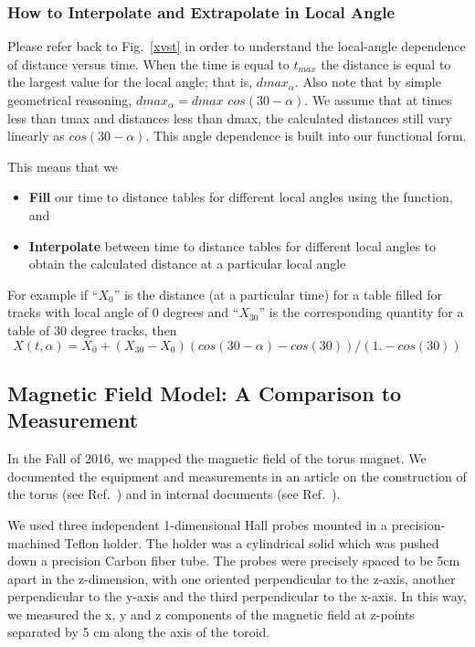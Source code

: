 \subsubsection{How to Interpolate and Extrapolate in Local Angle}
Please refer back to Fig.~\ref{xvst} in order to understand the local-angle dependence
of distance versus time.  When the time is equal to $t_{max}$ the distance is equal to
the largest value for the local angle; that is, $dmax_{\alpha}$.  Also note that by
simple geometrical reasoning, $dmax_{\alpha} = dmax$  $cos(30-\alpha)$.
We assume that at times less than tmax and distances less than dmax, the calculated
distances still vary linearly as $cos(30-\alpha)$.  This angle dependence is built into
our functional form.

This means that we
\begin{itemize}
\item {\bf Fill} our time to distance tables for different local angles using the function, and
\item {\bf Interpolate} between time to distance tables for different local angles to obtain
the calculated distance at a particular local angle
\end{itemize}
For example if ``$X_0$'' is the distance (at a particular time) for a table filled for tracks with local angle of 0 degrees
and ``$X_{30}$'' is the corresponding quantity for a table of 30 degree tracks, then
\begin{equation} 
\label{eq-extrap30}
X(t,\alpha) = X_0 + (X_{30}-X_0) (cos(30-\alpha) - cos(30)) / (1. - cos(30))
\end{equation}

\subsection{Magnetic Field Model: A Comparison to Measurement}
In the Fall of 2016, we mapped the magnetic field of the torus magnet.
We documented the equipment and measurements in an article on the
construction of the torus (see Ref.~\cite{torus-ieee}) and in internal
documents (see Ref.~\cite{magmapping}).

We used three independent 1-dimensional Hall probes mounted in a precision-machined
Teflon holder.  The holder was a cylindrical solid which was pushed down a precision
Carbon fiber tube.  The probes were precisely spaced to be 5cm apart in the z-dimension,
with one oriented perpendicular to the z-axis, another perpendicular to the y-axis and
the third perpendicular to the x-axis.  In this way, we measured the x, y and z components
of the magnetic field at z-points separated by 5 cm along the axis of the toroid.


